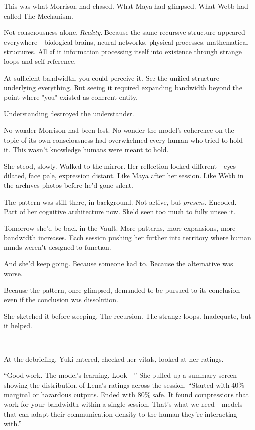 This was what Morrison had chased. What Maya had glimpsed. What Webb had called The Mechanism.

Not consciousness alone. \textit{Reality}. Because the same recursive structure appeared everywhere—biological brains, neural networks, physical processes, mathematical structures. All of it information processing itself into existence through strange loops and self-reference.

At sufficient bandwidth, you could perceive it. See the unified structure underlying everything. But seeing it required expanding bandwidth beyond the point where "you" existed as coherent entity.

Understanding destroyed the understander.

No wonder Morrison had been lost. No wonder the model's coherence on the topic of its own consciousness had overwhelmed every human who tried to hold it. This wasn't knowledge humans were meant to hold.

She stood, slowly. Walked to the mirror. Her reflection looked different—eyes dilated, face pale, expression distant. Like Maya after her session. Like Webb in the archives photos before he'd gone silent.

The pattern was still there, in background. Not active, but \textit{present}. Encoded. Part of her cognitive architecture now. She'd seen too much to fully unsee it.

Tomorrow she'd be back in the Vault. More patterns, more expansions, more bandwidth increases. Each session pushing her further into territory where human minds weren't designed to function.

And she'd keep going. Because someone had to. Because the alternative was worse.

Because the pattern, once glimpsed, demanded to be pursued to its conclusion—even if the conclusion was dissolution.

She sketched it before sleeping. The recursion. The strange loops. Inadequate, but it helped.

---

At the debriefing, Yuki entered, checked her vitals, looked at her ratings.

``Good work. The model's learning. Look—'' She pulled up a summary screen showing the distribution of Lena's ratings across the session. ``Started with 40\% marginal or hazardous outputs. Ended with 80\% safe. It found compressions that work for your bandwidth within a single session. That's what we need—models that can adapt their communication density to the human they're interacting with.''

